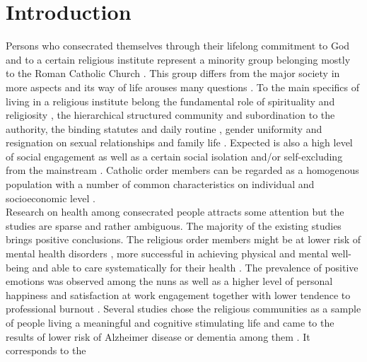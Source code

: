 \documentclass[ijerph,article,accept,moreauthors,pdftex]{mdpi}
\begin{document}

\hypertarget{introduction}{%
\section{Introduction}\label{introduction}}

Persons who consecrated themselves through their lifelong commitment to
God and to a certain religious institute represent a minority group
belonging mostly to the Roman Catholic Church
\citep{holtz2006geschichte, frank1988geschichte}. This group differs
from the major society in more aspects and its way of life arouses many
questions \citep{cist2019living, elias2019monasticism}. To the main
specifics of living in a religious institute belong the fundamental role
of spirituality \citep{bussing2017validation} and religiosity
\citep{quartier2017monastic}, the hierarchical structured community and
subordination to the authority, the binding statutes and daily routine
\citep{wrobel2018duties, fernandez2019convents}, gender uniformity and
resignation on sexual relationships and family life
\citep{huel2018missionaries}. Expected is also a high level of social
engagement \citep{bickerton2013spiritual} as well as a certain social
isolation and/or self-excluding from the mainstream
\citep{jewdokimow2019transcending, meawad2020sexuality}. Catholic order
members can be regarded as a homogenous population with a number of
common characteristics on individual and socioeconomic level
\citep{bowen2018community}.\\
Research on health among consecrated people attracts some attention but
the studies are sparse and rather ambiguous. The majority of the
existing studies brings positive conclusions. The religious order
members might be at lower risk of mental health disorders
\citep{rogowska2020investigating}, more successful in achieving physical
and mental well-being \citep{corwin2014lord} and able to care
systematically for their health \citep{huck1996health}. The prevalence
of positive emotions was observed among the nuns
\citep{skrzypinska2012intricacies} as well as a higher level of personal
happiness \citep{francis2018happiness} and satisfaction at work
engagement \citep{ariza2018work} together with lower tendence to
professional burnout \citep{chirico2020spirituality}. Several studies
chose the religious communities as a sample of people living a
meaningful and cognitive stimulating life and came to the results of
lower risk of Alzheimer disease or dementia among them
\citep{keohane2019nun, schott2019stability}. It corresponds to the
\end{document}
